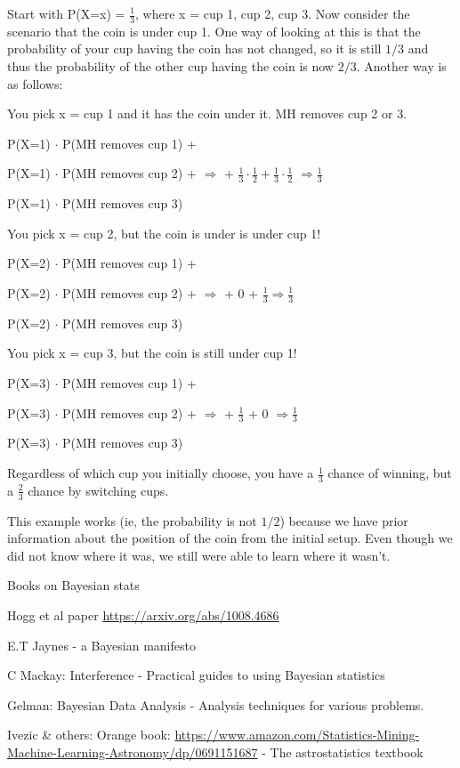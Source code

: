 \documentclass[12pt]{article}
\begin{document}
\noindent Start with P(X=x) = $\frac{1}{3}$, where x = cup 1, cup 2, cup 3. Now consider the scenario that the coin is under cup 1. One way of looking at this is that the probability of your cup having the coin has not changed, so it is still $1/3$ and thus the probability of the other cup having the coin is now $2/3$. Another way is as follows:

\bigskip

\noindent You pick x = cup 1 and it has the coin under it. MH removes cup 2 or 3.

P(X=1) $\cdot$ P(MH removes cup 1) +

P(X=1) $\cdot$ P(MH removes cup 2) + \indent  $\Rightarrow$  + $\frac{1}{3} \cdot \frac{1}{2} + \frac{1}{3} \cdot \frac{1}{2}$ $\Rightarrow \frac{1}{3}$

P(X=1) $\cdot$ P(MH removes cup 3)

\bigskip

\noindent You pick x = cup 2, but the coin is under is under cup 1!

P(X=2) $\cdot$ P(MH removes cup 1) +

P(X=2) $\cdot$ P(MH removes cup 2) + \indent  $\Rightarrow$  + 0 + $\frac{1}{3} \Rightarrow \frac{1}{3}$

P(X=2) $\cdot$ P(MH removes cup 3)

\bigskip

\noindent You pick x = cup 3, but the coin is still under cup 1!

P(X=3) $\cdot$ P(MH removes cup 1) +

P(X=3) $\cdot$ P(MH removes cup 2) + \indent  $\Rightarrow$  + $\frac{1}{3}$ + 0 $\Rightarrow \frac{1}{3}$

P(X=3) $\cdot$ P(MH removes cup 3)


\noindent Regardless of which cup you initially choose, you have a $\frac{1}{3}$ chance of winning, but a $\frac{2}{3}$ chance by switching cups.

This example works (ie, the probability is not $1/2$) because we have prior information about the position of the coin from the initial setup. Even though we did not know where it was, we still were able to learn where it wasn't.

\bigskip


\noindent Books on Bayesian stats

Hogg et al paper \url{https://arxiv.org/abs/1008.4686}

E.T Jaynes - a Bayesian manifesto

C Mackay: Interference - Practical guides to using Bayesian statistics

Gelman: Bayesian Data Analysis - Analysis techniques for various problems.

Ivezic \& others: Orange book: \url{https://www.amazon.com/Statistics-Mining-Machine-Learning-Astronomy/dp/0691151687} - The astrostatistics textbook
\end{document}
